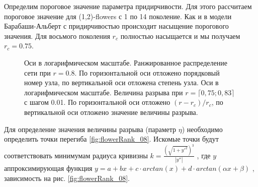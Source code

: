 \documentclass[10pt,aps,pra]{revtex4-1}
\begin{document}
        Определим пороговое значение параметра придирчивости. Для этого рассчитаем пороговое значение для (1,2)-flowers с 1 по 14 поколение. Как и в модели Барабаши-Альберт с придирчивостью происходит насыщение порогового значения. Для восьмого поколения $r_c$ полностью насыщается и мы получаем $r_c=0.75$. 

            \begin{figure}[H]  
                \centering

                \caption{
                    \label{fig:flowerRank}
                     Оси в логарифмическом масштабе. Ранжированное распределение сети при $r=0.8$. По горизонтальной оси отложено порядковый номер узла, по вертикальной оси отложена степень узла.
                     Оси в логарифмическом масштабе. Величина разрыва при $r=\lceil 0,75; 0,83 \rceil$ с шагом 0.01. По горизонтальной оси отложено $(r-r_c)/r_c$, по вертикальной оси отложено значение величины разрыва.
                }
            \end{figure}

        Для определение значения величины разрыва (параметр $\eta$) необходимо определить точки перегиба \ref{fig:flowerRank_08}. Искомые точки будут соответствовать минимумам радиуса кривизны $k=\frac{(\sqrt{1+y'^2})^3}{|y''|}$ \cite{Hazewinkel}, где $y$ аппроксимирующая функция $y=a+bx+c \cdot arctan(x) + d \cdot arctan(\alpha x + \beta)$ \cite{Mills}, зависимость на рис. \ref{fig:flowerRank_08}.
\end{document}
